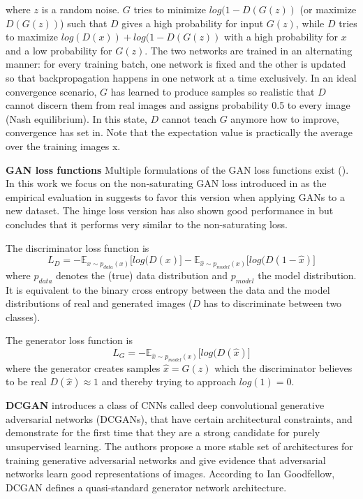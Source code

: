 \documentclass[11pt,a4paper]{article}
\begin{document}
where $z$ is a random noise. $G$ tries to minimize $log(1 - D(G(z))$ (or maximize $D(G(z))$) such that $D$ gives a high probability for input $G(z)$, while $D$ tries to maximize $log(D(x)) + log(1 - D(G(z))$ with a high probability for $x$ and a low probability for $G(z)$. The two networks are trained in an alternating manner: for every training batch, one network is fixed and the other is updated so that backpropagation happens in one network at a time exclusively. In an ideal convergence scenario, $G$ has learned to produce samples so realistic that $D$ cannot discern them from real images and assigns probability 0.5 to every image (Nash equilibrium). In this state, $D$ cannot teach $G$ anymore how to improve, convergence has set in. Note that the expectation value is practically the average over the training images x.

\par \textbf{GAN loss functions} 
Multiple formulations of the GAN loss functions exist (\cite{1807.04720}). In this work we focus on the non-saturating GAN loss introduced in \cite{1406.2661} as the empirical evaluation in \cite{1807.04720} suggests to favor this version when applying GANs to a new dataset. The hinge loss version has also shown good performance in \cite{1802.05957} but \cite{1807.04720} concludes that it performs very similar to the non-saturating loss.

The discriminator loss function is
\begin{equation} \label{eq:d_loss}
    L_{D} = -\mathbb{E}_{x\sim p_{data} (x)}\big[log(D(x)\big] - \mathbb{E}_{\hat{x}\sim p_{model} (x)}\big[log(D(1 - \hat{x})\big]
\end{equation}
where $p_{data}$ denotes the (true) data distribution and $p_{model}$ the model distribution. It is equivalent to the binary cross entropy between the data and the model distributions of real and generated images ($D$ has to discriminate between two classes).

The generator loss function is
\begin{equation} \label{eq:g_loss}
    L_{G} = -\mathbb{E}_{\hat{x}\sim p_{model} (x)}\big[log(D(\hat{x})\big]
\end{equation}
where the generator creates samples $\hat{x} = G(z)$ which the discriminator believes to be real $D(\hat{x}) \approx 1$ and thereby trying to approach $log(1) = 0$.


\par \textbf{DCGAN} \cite{1511.06434} introduces a class of CNNs called deep convolutional generative adversarial networks (DCGANs), that have certain architectural constraints, and demonstrate for the first time that they are a strong candidate for purely unsupervised learning. The authors propose a more stable set of architectures for training generative adversarial networks and give evidence that adversarial networks learn good representations of images. According to Ian Goodfellow, DCGAN defines a quasi-standard generator network architecture. 
\end{document}
